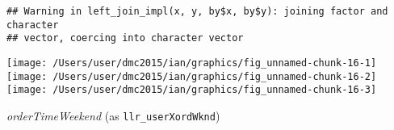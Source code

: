 \documentclass[10pt]{report}
\newenvironment{Shaded}{}{}
\newcommand{\KeywordTok}[1]{\textcolor[rgb]{0.00,0.44,0.13}{\textbf{{#1}}}}
\newcommand{\DataTypeTok}[1]{\textcolor[rgb]{0.56,0.13,0.00}{{#1}}}
\newcommand{\StringTok}[1]{\textcolor[rgb]{0.25,0.44,0.63}{{#1}}}
\newcommand{\NormalTok}[1]{{#1}}
\begin{document}
\begin{Shaded}
\end{Shaded}

\begin{verbatim}
## Warning in left_join_impl(x, y, by$x, by$y): joining factor and character
## vector, coercing into character vector
\end{verbatim}

\begin{Shaded}
\end{Shaded}

\begin{center}\texttt{[image: /Users/user/dmc2015/ian/graphics/fig\_unnamed-chunk-16-1]} \texttt{[image: /Users/user/dmc2015/ian/graphics/fig\_unnamed-chunk-16-2]} \texttt{[image: /Users/user/dmc2015/ian/graphics/fig\_unnamed-chunk-16-3]} \end{center}

\emph{orderTimeWeekend} (as \texttt{llr\_userXordWknd})
\end{document}
